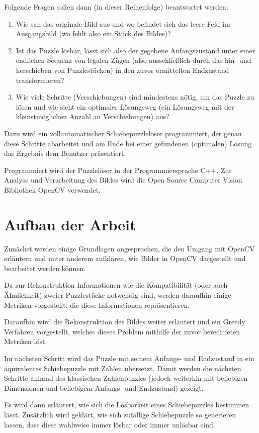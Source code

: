 \documentclass{whswinvcbook}
\begin{document}
Folgende Fragen sollen dann (in dieser Reihenfolge) beantwortet werden:
\begin{enumerate}
    \item Wie sah das originale Bild aus und wo befindet sich das leere Feld im Ausgangsbild (wo fehlt also ein Stück des Bildes)?
    \item Ist das Puzzle lösbar, lässt sich also der gegebene Anfangszustand unter einer endlichen Sequenz von legalen Zügen (also ausschließlich durch das hin- und herschieben von Puzzlestücken) in den zuvor ermittelten Endzustand transformieren?
    \item Wie viele Schritte (Verschiebungen) sind mindestens nötig, um das Puzzle zu lösen und wie sieht ein optimaler Lösungsweg (ein Lösungsweg mit der kleinstmöglichen Anzahl an Verschiebungen) aus?
\end{enumerate}
Dazu wird ein vollautomatischer Schiebepuzzlelöser programmiert, der genau diese Schritte abarbeitet und am Ende bei einer gefundenen (optimalen) Lösung das Ergebnis dem Benutzer präsentiert.

Programmiert wird der Puzzlelöser in der Programmiersprache C++. Zur Analyse und Verarbeitung des Bildes wird die Open Source Computer Vision Bibliothek OpenCV verwendet.
\section{Aufbau der Arbeit}
Zunächst werden einige Grundlagen angesprochen, die den Umgang mit OpenCV erläutern und unter anderem aufklären, wie Bilder in OpenCV dargestellt und bearbeitet werden können.

Da zur Rekonstruktion Informationen wie die Kompatibilität (oder auch Ähnlichkeit) zweier Puzzlestücke notwendig sind, werden daraufhin einige Metriken vorgestellt, die diese Informationen repräsentieren.

Daraufhin wird die Rekonstruktion des Bildes weiter erläutert und ein Greedy Verfahren vorgestellt, welches dieses Problem mithilfe der zuvor berechneten Metriken löst.

Im nächsten Schritt wird das Puzzle mit seinem Anfangs- und Endzustand in ein äquivalentes Schiebepuzzle mit Zahlen übersetzt. Damit werden die nächsten Schritte anhand des klassischen Zahlenpuzzles (jedoch weiterhin mit beliebigen Dimensionen und beliebigem Anfangs- und Endzustand) gezeigt.

Es wird dann erläutert, wie sich die Lösbarkeit eines Schiebepuzzles bestimmen lässt. Zusätzlich wird geklärt, wie sich zufällige Schiebepuzzle so generieren lassen, dass diese wahlweise immer lösbar oder immer unlösbar sind.
\end{document}
